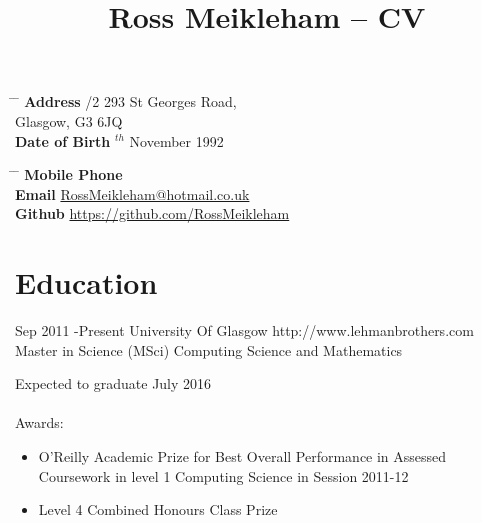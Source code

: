 \documentclass[10pt]{article} %
\begin{document}

\title{Ross Meikleham -- CV} %


\parbox{0.5\textwidth}{ %
\begin{tabbing} %
\hspace{3cm} \= \hspace{4cm} \= \kill %
{\bf Address} /2 293 St Georges Road,\\ %
\> Glasgow, G3 6JQ \\ %
{\bf Date of Birth} $^{th}$ November 1992 \\ %

\end{tabbing}}
\hfill %
\parbox{0.5\textwidth}{ %
\begin{tabbing} %
\hspace{3cm} \= \hspace{4cm} \= \kill %
{\bf Mobile Phone}  \\ %
{\bf Email} \> \href{mailto:rossmeikleham@hotmail.co.uk}{RossMeikleham@hotmail.co.uk} \\ %
{\bf Github} \> \href{https://github.com/RossMeikleham}{https://github.com/RossMeikleham}  %
\end{tabbing}}
\section{Education}

\job
{Sep 2011 -}{Present}
{University Of Glasgow}
{http://www.lehmanbrothers.com}
{Master in Science (MSci) Computing Science and Mathematics}
{Expected to graduate July 2016\\\\
Awards:
\begin{itemize}
\item{O’Reilly Academic Prize for Best Overall Performance in Assessed Coursework in level 1 Computing Science in Session 2011-12}
\item{Level 4 Combined Honours Class Prize}
\end{itemize}}
\end{document}
